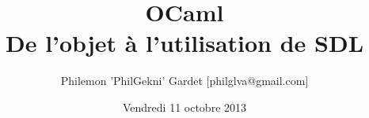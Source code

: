\documentclass[hideothersubsections]{beamer}
\title{OCaml \\ De l'objet à l'utilisation de SDL}
\author{Philemon 'PhilGekni' Gardet [philglva@gmail.com]}
\institute{\texttt{[image: pics/epita.png]}\\\texttt{[image: pics/gconfs.png]}}
\date{Vendredi 11 octobre 2013}
\begin{document}
	\begin{frame}
		\titlepage
	\end{frame}

	

	\begin{frame}
		\tableofcontents
	\end{frame}

	
	
	
	
	
	
	
\end{document}
